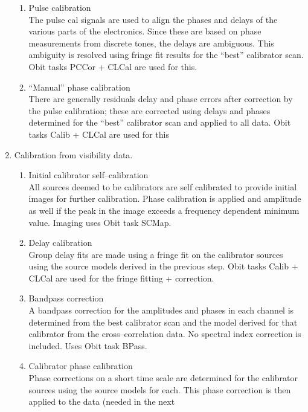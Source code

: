 \documentclass[11pt]{article}
\begin{document}
\begin{enumerate}
\begin {enumerate}
The reference antenna is picked on the basis of strong source
detections.
The best calibration scan is then selected on the basis of the fringe
fit signal--to--noise estimates.
This scan is the one involving the largest number of antennas and with
the highest average SNR.
Obit task Calib is  used for the fringe fitting.
\item Pulse calibration\\
The pulse cal signals are used to align the phases and delays of the
various parts of the electronics.
Since these are based on phase measurements from discrete tones, the
delays are ambiguous.
This ambiguity is resolved using fringe fit results for the ``best''
calibrator scan.
Obit tasks PCCor + CLCal are used for this.
\item ``Manual'' phase calibration\\
There are generally residuals delay and phase errors after correction
by the pulse calibration;  these are corrected using delays and phases
determined for the ``best'' calibrator scan and applied to all data.
Obit tasks Calib + CLCal are used for this
\end{enumerate}
\item Calibration from visibility data.
\begin {enumerate}
\item Initial calibrator self--calibration\\
All sources deemed to be calibrators are self calibrated to provide
initial images for further calibration.
Phase calibration is applied and amplitude as well if the peak in the
image exceeds a frequency dependent minimum value.
Imaging uses Obit task SCMap.
\item Delay calibration\\
Group delay fits are made using a fringe fit on the calibrator sources
using the source models derived in the previous step.
Obit tasks Calib  + CLCal are used for the fringe fitting + correction.
\item Bandpass correction \\
A bandpass correction for the amplitudes and phases in each channel is
determined from the best calibrator scan and the model derived for
that calibrator from the cross--correlation data.
No spectral index correction is included.
Uses Obit task BPass.
\item Calibrator phase calibration \\
Phase corrections on a short time scale are determined for the
calibrator sources using the source models for each.
This phase correction is then applied to the data (needed in the next

\end{enumerate}
\end{enumerate}
\end{document}
